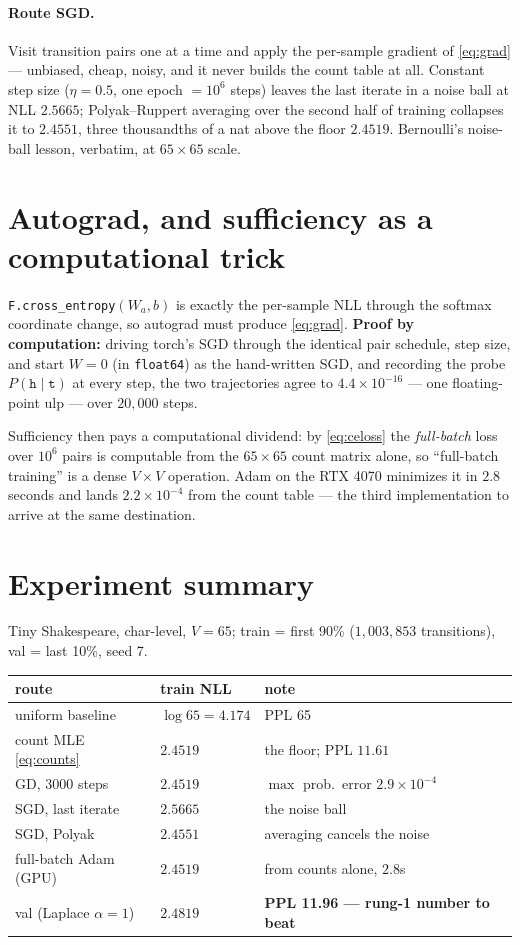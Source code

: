 \documentclass[11pt]{article}
\begin{document}
\paragraph{Route SGD.} Visit transition pairs one at a time and apply
the per-sample gradient of \eqref{eq:grad} --- unbiased, cheap, noisy,
and it never builds the count table at all. Constant step size
($\eta = 0.5$, one epoch $= 10^6$ steps) leaves the last iterate in a
noise ball at NLL $2.5665$; Polyak--Ruppert averaging over the second
half of training collapses it to $2.4551$, three thousandths of a nat
above the floor $2.4519$. Bernoulli's noise-ball lesson, verbatim, at
$65 \times 65$ scale.

\section{Autograd, and sufficiency as a computational trick}
\label{sec:autograd}

\texttt{F.cross\_entropy}$(W_a, b)$ is exactly the per-sample NLL
through the softmax coordinate change, so autograd must produce
\eqref{eq:grad}. \textbf{Proof by computation:} driving torch's SGD
through the identical pair schedule, step size, and start $W = 0$ (in
\texttt{float64}) as the hand-written SGD, and recording the probe
$P(\texttt{h} \mid \texttt{t})$ at every step, the two trajectories
agree to $4.4\times10^{-16}$ --- one floating-point ulp --- over
$20{,}000$ steps.

Sufficiency then pays a computational dividend: by \eqref{eq:celoss}
the \emph{full-batch} loss over $10^6$ pairs is computable from the
$65\times65$ count matrix alone, so ``full-batch training'' is a dense
$V \times V$ operation. Adam on the RTX 4070 minimizes it in $2.8$
seconds and lands $2.2\times10^{-4}$ from the count table --- the third
implementation to arrive at the same destination.

\section{Experiment summary}

Tiny Shakespeare, char-level, $V = 65$; train = first 90\%
($1{,}003{,}853$ transitions), val = last 10\%, seed 7.
\begin{center}
\begin{tabular}{llll}
route & train NLL & note \\
\hline
uniform baseline & $\log 65 = 4.174$ & PPL 65 \\
count MLE \eqref{eq:counts} & $2.4519$ & the floor; PPL $11.61$ \\
GD, $3000$ steps & $2.4519$ & $\max$ prob.\ error $2.9\times10^{-4}$ \\
SGD, last iterate & $2.5665$ & the noise ball \\
SGD, Polyak & $2.4551$ & averaging cancels the noise \\
full-batch Adam (GPU) & $2.4519$ & from counts alone, $2.8$s \\
\hline
val (Laplace $\alpha{=}1$) & $2.4819$ & \textbf{PPL 11.96 — rung-1
  number to beat} \\
\end{tabular}
\end{center}
\end{document}
